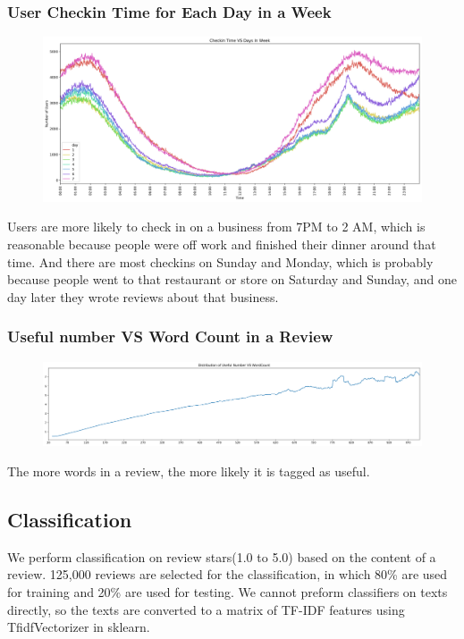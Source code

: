 \documentclass[12pt]{article}
\begin{document}
\subsubsection{User Checkin Time for Each Day in a Week}
\begin{figure}[H]
\begin{center}
    \includegraphics[width=1.0\textwidth]{../05_dataMining/checkinTimeVSDay.png}
\end{center}
\end{figure}
Users are more likely to check in on a business from 7PM to 2 AM, which is reasonable because people were off work and finished their dinner around that time. And there are most checkins on Sunday and Monday, which is probably because people went to that restaurant or store on Saturday and Sunday, and one day later they wrote reviews about that business.

\subsubsection{Useful number VS Word Count in a Review}
\begin{figure}[H]
\begin{center}
    \includegraphics[width=1.0\textwidth]{../05_dataMining/distributionUsefulWordCount.png}
\end{center}
\end{figure}
The more words in a review, the more likely it is tagged as useful.
\subsection{Classification}
We perform classification on review stars(1.0 to 5.0) based on the content of a review. 125,000 reviews are selected for the classification, in which 80\% are used for training and 20\% are used for testing. We cannot preform classifiers on texts directly, so the texts are converted to a matrix of TF-IDF features using TfidfVectorizer in sklearn.
\end{document}
